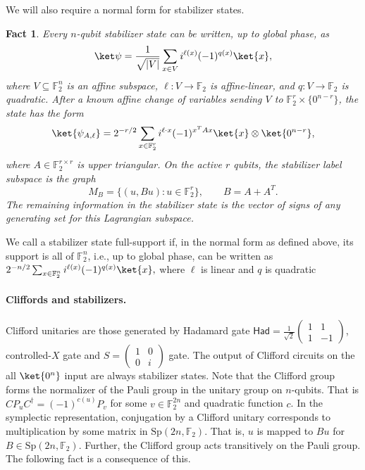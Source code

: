 \documentclass[11pt]{article}
\newtheorem{fact}[theorem]{Fact}
\newcommand{\F}{\mathbb{F}}
\begin{document}
We will also require a normal form for stabilizer states.

\begin{fact}
\label{fact:normal-form}
Every $n$-qubit stabilizer state can be written, up to global phase, as
$$
    \ket\psi
    =
    \frac1{\sqrt{|V|}}
    \sum_{x\in V} i^{\ell(x)}(-1)^{q(x)}\ket{x},
$$
where $V\subseteq\F_2^n$ is an affine subspace, $\ell:V\to\F_2$ is affine-linear,
and $q:V\to\F_2$ is quadratic.  After a known affine change of variables sending
$V$ to $\F_2^r\times\{0^{n-r}\}$, the state has the form
$$
    \ket{\psi_{A,\ell}}
    =
    2^{-r/2}\sum_{x\in\F_2^r} i^{\ell\cdot x}(-1)^{x^TAx}\ket{x}\otimes
    \ket{0^{n-r}},
$$
where $A\in\F_2^{r\times r}$ is upper triangular.  On the active $r$ qubits,
the stabilizer label subspace is the graph
$$
    M_B=\{(u,Bu):u\in\F_2^r\},
    \qquad B=A+A^T.
$$
The remaining information in the stabilizer state is the vector of signs of any
generating set for this Lagrangian subspace.
\end{fact}
We call a stabilizer state full-support if, in the normal form as defined above, its support is all of $\F_2^n$, i.e., up to global phase, can be written as
$
    2^{-n/2}\sum_{x\in\F_2^n} i^{\ell(x)}(-1)^{q(x)}\ket{x},
$
where $\ell$ is linear and $q$ is quadratic

\paragraph{Cliffords and stabilizers.} Clifford unitaries are those generated by Hadamard gate $\textsf{Had}=\frac{1}{\sqrt{2}}\begin{pmatrix}
1 & 1\\
1 & -1
\end{pmatrix}$, controlled-$X$ gate and $S=\begin{pmatrix}
1 & 0\\
0 & i
\end{pmatrix}$ gate. The output of Clifford circuits on the all $\ket{0^n}$ input are always stabilizer states. Note that the Clifford group forms the normalizer of the Pauli group in the unitary group on $n$-qubits. That is $CP_uC^\dagger = (-1)^{c(u)} P_v$ for some $v\in\F_2^{2n}$ and quadratic function $c$. In the symplectic representation, conjugation by a Clifford unitary corresponds to multiplication by some matrix in $\text{Sp}(2n,\F_2)$. That is, $u$ is mapped to $Bu$ for $B \in \text{Sp}(2n,\F_2)$. Further, the Clifford group acts transitively on the Pauli group. The following fact is a consequence of this.
\end{document}

